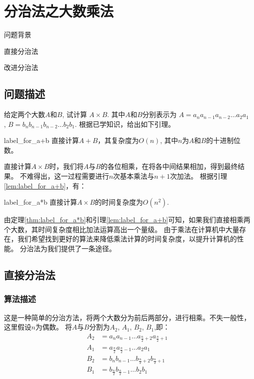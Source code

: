 \chapter{分治法之大数乘法}
\begin{introduction}
    \item 问题背景
    \item 直接分治法
    \item 改进分治法
\end{introduction}

\section{问题描述}
给定两个大数$A$和$B$, 试计算
\begin{math}
    A \times B
\end{math}.
其中$A$和$B$分别表示为
\begin{math}
    A = a_n a_{n-1} a_{n-2} \ldots a_2 a_1
\end{math}
,
\begin{math}
    B = b_n b_{n-1} b_{n-2} \ldots b_2 b_1
\end{math}.
根据已学知识，给出如下引理。

\begin{lemma}{}{label_for_a+b}
    直接计算$A + B$，其复杂度为$O(n)$, 其中$n$为$A$和$B$的十进制位数。
\end{lemma}

直接计算$A \times B$时，我们将$A$与$B$的各位相乘，在将各中间结果相加，得到最终结果。
不难得出，这一过程需要进行$n$次基本乘法与$n+1$次加法。
根据引理\ref{lem:label_for_a+b}，有：
\begin{theorem}{}{label_for_a*b}
    直接计算$A \times B$的时间复杂度为$O(n^2)$.
\end{theorem}

由定理\ref{thm:label_for_a*b}和引理\ref{lem:label_for_a+b}可知，如果我们直接相乘两个大数，其时间复杂度相比加法运算高出一个量级。
由于乘法在计算机中大量存在，我们希望找到更好的算法来降低乘法计算的时间复杂度，以提升计算机的性能。
分治法为我们提供了一条途径。
\section{直接分治法}
\subsection{算法描述}
这是一种简单的分治方法，将两个大数分为前后两部分，进行相乘。不失一般性，这里假设$n$为偶数。
将$A$与$B$分割为$A_2$, $A_1$, $B_2$, $B_1$,即：
\begin{displaymath}
    \begin{split}
        A_2 &= a_{n} a_{n-1} \ldots a_{\frac{n}{2} + 2} a_{\frac{n}{2} + 1}\\
        A_1 &= a_{\frac{n}{2}} a_{\frac{n}{2} - 1} \ldots a_2 a_1\\
        B_2 &= b_{n} b_{n-1} \ldots b_{\frac{n}{2} + 2} b_{\frac{n}{2} + 1}\\
        B_1 &= b_{\frac{n}{2}} b_{\frac{n}{2} - 1} \ldots b_2 b_1
    \end{split}
\end{displaymath}

